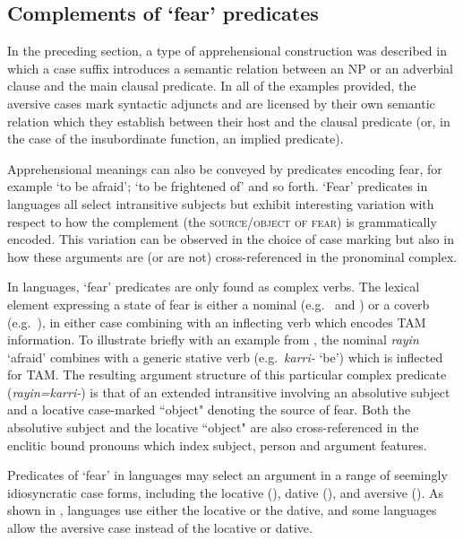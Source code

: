 \documentclass[output=paper,colorlinks,citecolor=brown]{langscibook}
\begin{document}
\subsection{Complements of `fear' predicates}
\label{subsec:complements}

In the preceding section, a type of apprehensional construction was described in which a case suffix introduces a semantic relation between an NP or an adverbial clause and the main clausal predicate. In all of the examples provided, the aversive cases mark syntactic adjuncts and are licensed by their own semantic relation which they establish between their host and the clausal predicate (or, in the case of the insubordinate function, an implied predicate).

Apprehensional meanings can also be conveyed by predicates encoding fear, for example `to be afraid'; `to be frightened of' and so forth. `Fear' predicates in  languages all select intransitive subjects but exhibit interesting variation with respect to how the complement (the \textsc{source/object of fear}) is grammatically encoded. This variation can be observed in the choice of case marking but also in how these arguments are (or are not) cross-referenced in the pronominal complex.

In  languages, `fear' predicates are only found as complex verbs. The lexical element expressing a state of fear is either a nominal (e.g.\   and ) or a coverb (e.g.\  ), in either case combining with an inflecting verb which encodes TAM information. To illustrate briefly with an example from , the nominal \textit{rayin} `afraid' combines with a generic stative verb (e.g.\  \textit{karri-} `be') which is inflected for TAM. The resulting argument structure of this particular complex predicate (\textit{rayin=karri-}) is that of an extended intransitive involving an absolutive subject and a locative case-marked ``object" denoting the source of fear. Both the absolutive subject and the locative ``object" are also cross-referenced in the enclitic bound pronouns which index subject, person and argument features.

Predicates of `fear' in  languages may select an argument in a range of seemingly idiosyncratic case forms, including the locative (), dative (), and aversive (). As shown in ,  languages use either the locative or the dative, and some languages allow the aversive case instead of the locative or dative. 
\end{document}
